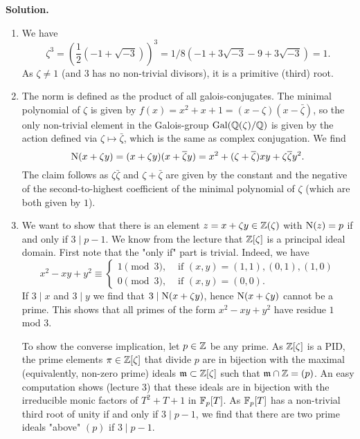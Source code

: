 \documentclass[a4paper,11pt]{article}
\begin{document}
\textbf{Solution.}
\begin{enumerate}
    \item We have 
        $$\zeta^3 = \left(\frac 12 (-1 + \sqrt{-3})\right)^3 = 1/8(-1 +
        3\sqrt{-3} - 9 + 3 \sqrt{-3}) = 1.$$ 
        As $\zeta \neq 1$ (and $3$ has no non-trivial
        divisors), it is a primitive (third) root. 
    \item The norm is defined as the product of all galois-conjugates. The minimal
        polynomial of $\zeta$ is given by $f(x) = x^2 + x + 1 = (x - \zeta)(x -
        \bar \zeta)$, so the only non-trivial element in the Galois-group
        $\operatorname{Gal}(\mathbb{Q}(\zeta)/\mathbb{Q})$ is given by the action defined via 
        $\zeta \mapsto \bar \zeta$, which is the same as complex conjugation. 
        We find 
        $$\operatorname{N}(x+\zeta y) = (x+\zeta y)(x + \overline \zeta y) = x^2 + (\zeta +
        \overline \zeta)xy + \zeta \overline \zeta y^2.$$
        The claim follows as $\zeta \bar \zeta$ and $\zeta + \bar \zeta$
        are given by the constant and the negative of the second-to-highest
        coefficient of the minimal polynomial of $\zeta$ (which are both given by
        $1$).
    \item We want to show that there is an element $z = x + \zeta y \in \mathbb{Z}(\zeta)$ 
        with $\operatorname{N}(z) = p$ if and only if $3 \mid p-1$. We know from the lecture
        that $\mathbb{Z}[\zeta]$ is a principal ideal domain. 
        First note that the "only if" part is trivial. Indeed, we have
        \begin{equation*}
            x^2 -xy + y^2 \equiv \begin{cases}
                1 \pmod 3, &\text{ if } (x,y) = (1,1), (0,1), (1,0)\\
                0 \pmod 3, &\text{ if } (x,y) = (0,0).
            \end{cases}
        \end{equation*}
        If $3 \mid x$ and $3 \mid y$ we find that $3 \mid \operatorname{N}(x+\zeta y)$,
        hence $\operatorname{N}(x+\zeta y)$ cannot be a prime. This shows that all primes
        of the form $x^2 -xy + y^2$ have residue $1$ mod $3$. 

        To show the converse implication, let $p \in \mathbb{Z}$ be any prime. 
        As $\mathbb{Z}[\zeta]$ is a PID, the prime elements $\pi \in \mathbb{Z}[\zeta]$
        that divide $p$ are in bijection with the maximal (equivalently,
        non-zero prime) ideals $\mathfrak{m} \subset \mathbb{Z}[\zeta]$ such that $\mathfrak{m} \cap \mathbb{Z} =
        (p)$. An easy computation shows (lecture 3) that these ideals are in
        bijection with the irreducible monic factors of $T^2 + T + 1$ in
        $\mathbb{F}_p[T]$. As $\mathbb{F}_p[T]$ has a non-trivial third root of unity if and
        only if $3 \mid p-1$, we find that there are 
        two prime ideals "above" $(p)$ if $3 \mid p-1$.


\end{enumerate}
\end{document}
